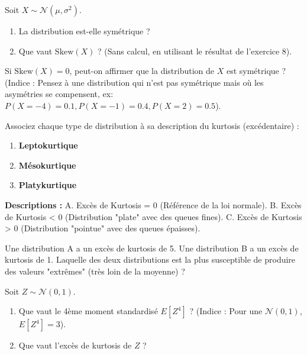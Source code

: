 \begin{exercicebox}
Soit $X \sim \mathcal{N}(\mu, \sigma^2)$.
\begin{enumerate}
    \item La distribution est-elle symétrique ?
    \item Que vaut $\text{Skew}(X)$ ? (Sans calcul, en utilisant le résultat de l'exercice 8).
\end{enumerate}
\end{exercicebox}

\begin{exercicebox}
Si $\text{Skew}(X) = 0$, peut-on affirmer que la distribution de $X$ est symétrique ?
(Indice : Pensez à une distribution qui n'est pas symétrique mais où les asymétries se compensent, ex: $P(X=-4)=0.1, P(X=-1)=0.4, P(X=2)=0.5$).
\end{exercicebox}


\begin{exercicebox}
Associez chaque type de distribution à sa description du kurtosis (excédentaire) :
\begin{enumerate}
    \item \textbf{Leptokurtique}
    \item \textbf{Mésokurtique}
    \item \textbf{Platykurtique}
\end{enumerate}

\textbf{Descriptions :}
A. Excès de Kurtosis = 0 (Référence de la loi normale).
B. Excès de Kurtosis < 0 (Distribution "plate" avec des queues fines).
C. Excès de Kurtosis > 0 (Distribution "pointue" avec des queues épaisses).
\end{exercicebox}

\begin{exercicebox}
Une distribution A a un excès de kurtosis de 5. Une distribution B a un excès de kurtosis de 1.
Laquelle des deux distributions est la plus susceptible de produire des valeurs "extrêmes" (très loin de la moyenne) ?
\end{exercicebox}

\begin{exercicebox}
Soit $Z \sim \mathcal{N}(0, 1)$.
\begin{enumerate}
    \item Que vaut le 4ème moment standardisé $E[Z^4]$ ? (Indice : Pour une $\mathcal{N}(0,1)$, $E[Z^4]=3$).
    \item Que vaut l'excès de kurtosis de $Z$ ?
\end{enumerate}
\end{exercicebox}

